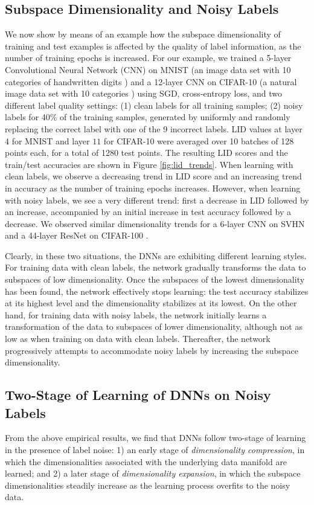 \documentclass{article}
\begin{document}
\subsection{Subspace Dimensionality and Noisy Labels}\label{sec:subsapce_dimensionality}
We now show by means of an example how the subspace dimensionality of training and test examples is affected by the quality of label information, as the number of training epochs is increased.
For our example, we trained a 5-layer Convolutional Neural Network (CNN) on MNIST (an image data set with 10 categories of handwritten digits \cite{lecun1998gradient}) and a 12-layer CNN on CIFAR-10 (a natural image data set with 10 categories \cite{krizhevsky2009learning}) using SGD, cross-entropy loss, and two different label quality settings: (1) clean labels for all training samples; (2) noisy labels for 40\% of the training samples, generated by uniformly and randomly replacing the correct label with one of the 9 incorrect labels. LID values at layer $4$ for MNIST and layer $11$ for CIFAR-10 were averaged over 10 batches of 128 points each, for a total of 1280 test points. The resulting LID scores and the train/test accuracies are shown in Figure \ref{fig:lid_trends}. When learning with clean labels, we observe a decreasing trend in LID score and an increasing trend in accuracy as the number of training epochs increases. However, when learning with noisy labels, we see a very different trend: first a decrease in LID followed by an increase, accompanied by an initial increase in test accuracy followed by a decrease. We observed similar dimensionality trends for a 6-layer CNN on SVHN \cite{netzer2011reading} and a 44-layer ResNet \cite{he2016deep} on CIFAR-100 \cite{krizhevsky2009learning}.

Clearly, in these two situations, the DNNs are exhibiting different learning styles. For training data with clean labels, the network gradually transforms the data to subspaces of low dimensionality. Once the subspaces of the lowest dimensionality has been found, the network effectively stops learning: the test accuracy stabilizes at its highest level and the dimensionality stabilizes at its lowest. On the other hand, for training data with noisy labels, the network initially learns a transformation of the data to subspaces of lower dimensionality, although not as low as when training on data with clean labels. Thereafter, the network progressively attempts to accommodate noisy labels by increasing the subspace dimensionality. 


\subsection{Two-Stage of Learning of DNNs on Noisy Labels}
From the above empirical results, we find that DNNs follow two-stage of learning in the presence of label noise: 1) an early stage of {\em dimensionality compression}, in which the dimensionalities associated with the underlying data manifold are learned; and 2) a later stage of {\em dimensionality expansion}, in which the subspace dimensionalities steadily increase as the learning process overfits to the noisy data. 
\end{document}
